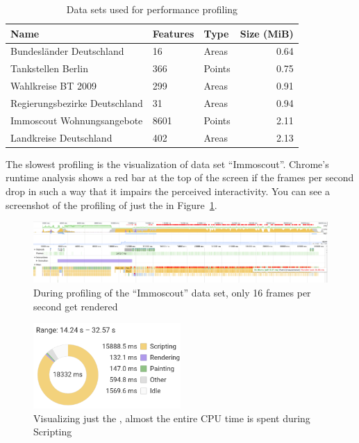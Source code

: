 \begin{table}[ht]
  \centering
  \begin{tabular}{lllr}
    Name & Features & Type & Size (MiB) \\
    \hline
    Bundesländer Deutschland      & 16   & Areas  & 0.64 \\
    Tankstellen Berlin            & 366  & Points & 0.75 \\
    Wahlkreise BT 2009            & 299  & Areas  & 0.91 \\
    Regierungsbezirke Deutschland & 31   & Areas  & 0.94 \\
    Immoscout Wohnungsangebote    & 8601 & Points & 2.11 \\
    Landkreise Deutschland        & 402  & Areas  & 2.13 \\
  \end{tabular}
  \caption{Data sets used for performance profiling}%
  \label{tab:evaluation:performance:data-sets}
\end{table}


The slowest profiling is the visualization of data set ``Immoscout''.
Chrome's runtime analysis shows a red bar at the top of the screen if the frames per second drop in such a way that it impairs the perceived interactivity.
You can see a screenshot of the profiling of just the \tmap{} in Figure~\ref{fig:evaluation:performance:profiling:immoscout_tmap_only:fps}.

\begin{figure}[h]
  \centering
  \includegraphics[width=\textwidth]{figures/evaluation/performance/profiles/immoscout_tmap_only/fps}
  \caption{During profiling of the ``Immoscout'' data set, only 16 frames per second get rendered}\label{fig:evaluation:performance:profiling:immoscout_tmap_only:fps}
\end{figure}

\begin{figure}[h]
  \centering
  \includegraphics[width=0.5\textwidth]{figures/evaluation/performance/profiles/immoscout_tmap_only/summary}
  \caption{Visualizing just the \tmap{}, almost the entire CPU time is spent during Scripting }\label{fig:evaluation:performance:profiling:immoscout_tmap_only:summary}
\end{figure}


